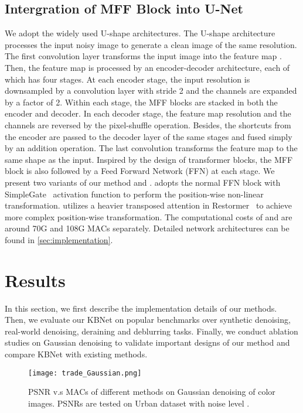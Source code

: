 \documentclass[default,iicol]{sn-jnl}
\theoremstyle{thmstyleone}\newtheorem{theorem}{Theorem}\newtheorem{proposition}[theorem]{Proposition}
\theoremstyle{thmstyletwo}\newtheorem{example}{Example}\newtheorem{remark}{Remark}
\theoremstyle{thmstylethree}\newtheorem{definition}{Definition}
\begin{document}
\subsection{Intergration of MFF Block into U-Net}
We adopt the widely used U-shape architectures.
The U-shape architecture processes the input noisy image  to generate a clean image of the same resolution. 
The first convolution layer transforms the input image into the feature map . 
Then, the feature map  is processed by an encoder-decoder architecture, each of which has four stages. 
At each encoder stage, the input resolution is downsampled by a convolution layer with stride 2 and the channels are expanded by a factor of 2. 
Within each stage, the MFF blocks are stacked in both the encoder and decoder.
In each decoder stage, the feature map resolution and the channels are reversed by the pixel-shuffle operation. 
Besides, the shortcuts from the encoder are passed to the decoder layer of the same stages and fused simply by an addition operation. 
The last convolution transforms the feature map to the same shape as the input.
Inspired by the design of transformer blocks, the MFF block is also followed by a Feed Forward Network (FFN) at each stage. 
We present two variants of our method  and .
 adopts the normal FFN block with SimpleGate~\cite{chen2022nafnet} activation function to perform the position-wise non-linear transformation.
 utilizes a heavier transposed attention in Restormer~\cite{restormer} to achieve more complex position-wise transformation.
The computational costs of  and  are around 70G and 108G MACs separately. Detailed network architectures can be found in \cref{sec:implementation}.


\section{Results}
In this section, we first describe the implementation details of our methods. Then, we evaluate our KBNet on popular benchmarks over synthetic denoising, real-world denoising, deraining and deblurring tasks.
Finally, we conduct ablation studies on Gaussian denoising to validate important designs of our method and compare KBNet with existing methods.

\begin{figure}[t]
    \centering
    \texttt{[image: trade\_Gaussian.png]}
    \caption{PSNR v.s  MACs of different methods on Gaussian denoising of color images. PSNRs are tested on Urban dataset with noise level .}
    \label{fig:trade_g}
\end{figure}
\end{document}
